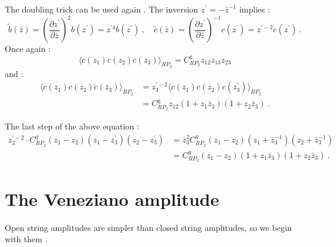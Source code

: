 The doubling trick can be used again . The inversion $z^{\prime}=-\bar{z}^{-1}$ implies :
\begin{equation}
	\tilde{b}(\bar{z})=\left(\frac{\partial z^{\prime}}{\partial \bar{z}}\right)^{2} b(z^{\prime})=z^{\prime 4} b(z^{\prime})\:, \quad 
	\tilde{c}(\bar{z})=\left(\frac{\partial z^{\prime}}{\partial \bar{z}}\right)^{-1} c(z^{\prime})=z^{\prime-2} c(z^{\prime}) \:. \label{6.3.12}
\end{equation}
Once again :
\begin{equation}
	\langle c(z_{1}) c(z_{2}) c(z_{3})\rangle_{RP_{2}}=C_{R P_{2}}^{\mathrm{g}} z_{12} z_{13} z_{23} \label{6.3.13}
\end{equation}
and :
\begin{align}
	\langle c(z_{1}) c(z_{2}) \tilde{c}(\bar{z}_{3})\rangle_{R P_{2}} 
	&=z_{3}^{\prime-2} \langle c(z_{1}) c(z_{2}) c(z_{3}^{\prime})\rangle_{R P_{2}} \nonumber \\
	&=C_{R P_{2}}^{\mathrm{g}} z_{12}(1+z_{1} \bar{z}_{3})(1+z_{2} \bar{z}_{3}) \:. \label{6.3.14}
\end{align}
\begin{tcolorbox}
	\begin{remark}
		The last step of the above equation :
		\begin{align*}
			z_{3}^{\prime-2} \cdot C_{R P_{2}}^{g}(z_{1}-z_{2})(z_{1}-z_{3}^{\prime})(z_{2}-z_{3}^{\prime}) 
			&= \bar{z}_{3}^{2} C_{R P_{2}}^{g}(z_{1}-z_{2})(z_{1}+\bar{z}_{3}^{-1})(z_{2}+\bar{z}_{3}^{-1}) \\
			&= C_{R P_{2}}^{g}(z_{1}-z_{2})(1+z_{1} \bar{z}_{3})(1+z_{2} \bar{z}_{3}) \:.
		\end{align*}
	\end{remark}
\end{tcolorbox}



\section{The Veneziano amplitude} \label{sec:6.4}

Open string amplitudes are simpler than closed string amplitudes, so we begin with them .

